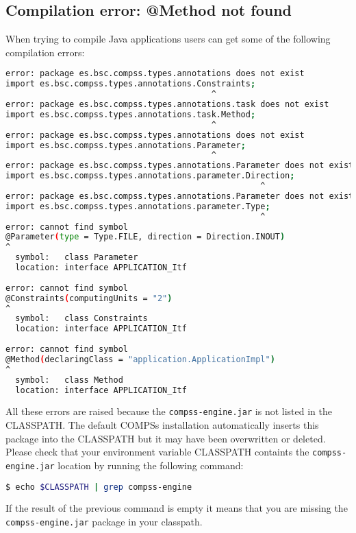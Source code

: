 %
%
\subsection{Compilation error: @Method not found}

When trying to compile Java applications users can get some of the following compilation errors:
\begin{lstlisting}[language=bash]
error: package es.bsc.compss.types.annotations does not exist
import es.bsc.compss.types.annotations.Constraints;
                                          ^
error: package es.bsc.compss.types.annotations.task does not exist
import es.bsc.compss.types.annotations.task.Method;
                                          ^
error: package es.bsc.compss.types.annotations does not exist
import es.bsc.compss.types.annotations.Parameter;
                                          ^
error: package es.bsc.compss.types.annotations.Parameter does not exist
import es.bsc.compss.types.annotations.parameter.Direction;
                                                    ^
error: package es.bsc.compss.types.annotations.Parameter does not exist
import es.bsc.compss.types.annotations.parameter.Type;
                                                    ^
error: cannot find symbol
@Parameter(type = Type.FILE, direction = Direction.INOUT)
^
  symbol:   class Parameter
  location: interface APPLICATION_Itf
  
error: cannot find symbol
@Constraints(computingUnits = "2")
^
  symbol:   class Constraints
  location: interface APPLICATION_Itf
  
error: cannot find symbol
@Method(declaringClass = "application.ApplicationImpl")
^
  symbol:   class Method
  location: interface APPLICATION_Itf
\end{lstlisting}

All these errors are raised because the \texttt{compss-engine.jar} is not listed in the CLASSPATH. The default COMPSs installation
automatically inserts this package into the CLASSPATH but it may have been overwritten or deleted. Please check that your 
environment variable CLASSPATH containts the \texttt{compss-engine.jar} location by running the following command:

\begin{lstlisting}[language=bash]
$ echo $CLASSPATH | grep compss-engine
\end{lstlisting}

If the result of the previous command is empty it means that you are missing the \texttt{compss-engine.jar} package in your classpath. 

